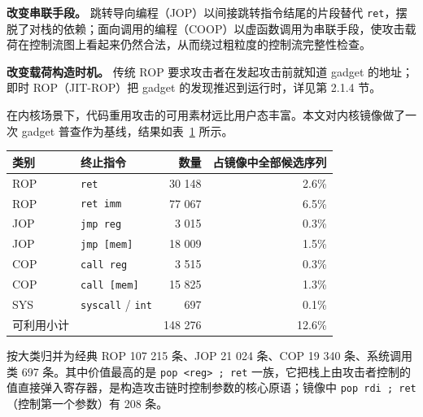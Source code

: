 \textbf{改变串联手段。} 跳转导向编程（JOP）\citep{bletsch2011jop}以间接跳转指令结尾的片段替代 \lstinline[breaklines=false]@ret@，摆脱了对栈的依赖；面向调用的编程（COOP）\citep{schuster2015coop}以虚函数调用为串联手段，使攻击载荷在控制流图上看起来仍然合法，从而绕过粗粒度的控制流完整性检查。

\textbf{改变载荷构造时机。} 传统 ROP 要求攻击者在发起攻击前就知道 gadget 的地址；即时 ROP（JIT-ROP）\citep{snow2013just}把 gadget 的发现推迟到运行时，详见第 2.1.4 节。

在内核场景下，代码重用攻击的可用素材远比用户态丰富。本文对内核镜像做了一次 gadget 普查作为基线，结果如表~\ref{tab:2-1} 所示。

\begin{table}[!htbp]
    \label{tab:2-1}
    \centering
    \footnotesize
    \setlength{\tabcolsep}{3pt}
    \renewcommand{\arraystretch}{1.25}
    \begin{tabular}{llrr}
        \hline
        类别 & 终止指令 & 数量 & 占镜像中全部候选序列\\
        \hline
        ROP & \lstinline[breaklines=false]@ret@ & 30 148 & 2.6\%\\
        ROP & \lstinline[breaklines=false]@ret imm@ & 77 067 & 6.5\%\\
        JOP & \lstinline[breaklines=false]@jmp reg@ & 3 015 & 0.3\%\\
        JOP & \lstinline[breaklines=false]@jmp [mem]@ & 18 009 & 1.5\%\\
        COP & \lstinline[breaklines=false]@call reg@ & 3 515 & 0.3\%\\
        COP & \lstinline[breaklines=false]@call [mem]@ & 15 825 & 1.3\%\\
        SYS & \lstinline[breaklines=false]@syscall@ / \lstinline[breaklines=false]@int@ & 697 & 0.1\%\\
        可利用小计 &  & 148 276 & 12.6\%\\
        \hline
    \end{tabular}
\end{table}

按大类归并为经典 ROP 107 215 条、JOP 21 024 条、COP 19 340 条、系统调用类 697 条。其中价值最高的是 \lstinline[breaklines=false]@pop <reg> ; ret@ 一族，它把栈上由攻击者控制的值直接弹入寄存器，是构造攻击链时控制参数的核心原语；镜像中 \lstinline[breaklines=false]@pop rdi ; ret@（控制第一个参数）有 208 条。

